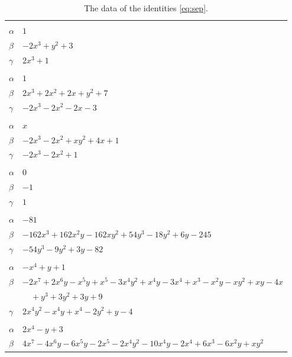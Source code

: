 \documentclass[11pt]{article}
\begin{document}
\begingroup\footnotesize
\setlength{\LTcapwidth}{\textwidth}
\begin{longtable}{@{}ll@{}}
\caption{The data of the identities \eqref{eq:sep}.}\label{tab:sep}\\
\hline\endfirsthead\hline\endhead\hline\endfoot
\multicolumn{2}{@{}l}{$\{i,j\}=\{0,1\}$, $k_{ij}=1$}\\
$\alpha$ & $1$\\
$\beta$ & $-2x^{3}+y^{2}+3$\\
$\gamma$ & $2x^{3}+1$\\
\addlinespace[3pt]
\multicolumn{2}{@{}l}{$\{i,j\}=\{0,9\}$, $k_{ij}=2^{2}$}\\
$\alpha$ & $1$\\
$\beta$ & $2x^{3}+2x^{2}+2x+y^{2}+7$\\
$\gamma$ & $-2x^{3}-2x^{2}-2x-3$\\
\addlinespace[3pt]
\multicolumn{2}{@{}l}{$\{i,j\}=\{0,20\}$, $k_{ij}=1$}\\
$\alpha$ & $x$\\
$\beta$ & $-2x^{3}-2x^{2}+xy^{2}+4x+1$\\
$\gamma$ & $-2x^{3}-2x^{2}+1$\\
\addlinespace[3pt]
\multicolumn{2}{@{}l}{$\{i,j\}=\{1,7\}$, $k_{ij}=1$}\\
$\alpha$ & $0$\\
$\beta$ & $-1$\\
$\gamma$ & $1$\\
\addlinespace[3pt]
\multicolumn{2}{@{}l}{$\{i,j\}=\{1,11\}$, $k_{ij}=1$}\\
$\alpha$ & $-81$\\
$\beta$ & $-162x^{3}+162x^{2}y-162xy^{2}+54y^{3}-18y^{2}+6y-245$\\
$\gamma$ & $-54y^{3}-9y^{2}+3y-82$\\
\addlinespace[3pt]
\multicolumn{2}{@{}l}{$\{i,j\}=\{1,22\}$, $k_{ij}=1$}\\
$\alpha$ & $-x^{4}+y+1$\\
$\beta$ & $-2x^{7}+2x^{6}y-x^{5}y+x^{5}-3x^{4}y^{2}+x^{4}y-3x^{4}+x^{3}-x^{2}y-xy^{2}+xy-4x$\\
 & $\quad +y^{3}+3y^{2}+3y+9$\\
$\gamma$ & $2x^{4}y^{2}-x^{4}y+x^{4}-2y^{2}+y-4$\\
\addlinespace[3pt]
\multicolumn{2}{@{}l}{$\{i,j\}=\{1,28\}$, $k_{ij}=3$}\\
$\alpha$ & $2x^{4}-y+3$\\
$\beta$ & $4x^{7}-4x^{6}y-6x^{5}y-2x^{5}-2x^{4}y^{2}-10x^{4}y-2x^{4}+6x^{3}-6x^{2}y+xy^{2}$\\

\end{longtable}
\end{document}
